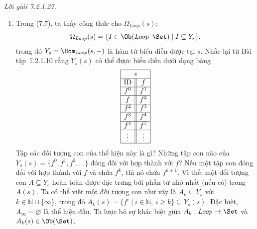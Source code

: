 \noindent\textit{Lời giải 7.2.1.27.}\keepwithnext
\begin{enumerate}[label=\alph*.]
\item Trong (7.7), ta thấy công thức cho $\Omega_{\mathit{Loop}}(s)$:
\[
\Omega_{\mathit{Loop}}(s)=\{I\in\Ob(\mathit{Loop}\text{--}\Set)\mid I\subseteq Y_s\},
\]
trong đó $Y_s=\Hom_{\mathit{Loop}}(s,-)$ là hàm tử biểu diễn được tại $s$. Nhắc lại từ Bài tập~7.2.1.10 rằng $Y_s(s)$ có thể được biểu diễn dưới dạng bảng
\[
\begin{array}{|c||c|}\hline\multicolumn{2}{|c|}{s}\\\hline\text{ID}&f\\\hline
f^0&f^1\\\hline f&f^2\\\hline f^2&f^3\\\hline f^3&f^4\\\hline f^4&f^5\\\hline\vdots&\vdots\\\hline\end{array}
\]
Tập các đối tượng con của thể hiện này là gì? Những tập con nào của $Y_s(s)=\{f^0,f^1,f^2,\ldots\}$ đóng đối với hợp thành với $f$? Nếu một tập con đóng đối với hợp thành với $f$ và chứa $f^k$, thì nó chứa $f^{k+1}$. Vì thế, một đối tượng con $A\subseteq Y_s$ hoàn toàn được đặc trưng bởi phần tử nhỏ nhất (nếu có) trong $A(s)$. Ta có thể viết một đối tượng con như vậy là $A_k\subseteq Y_s$ với $k\in\mathbb N\sqcup\{\infty\}$, trong đó $A_k(s)=\{f^i\mid i\in\mathbb N,\ i\ge k\}\subseteq Y_s(s)$. Đặc biệt, $A_\infty=\varnothing$ là thể hiện đầu. Ta lược bỏ sự khác biệt giữa $A_k:\mathit{Loop}\to\Set$ và $A_k(s)\in\Ob(\Set)$.


\end{enumerate}
